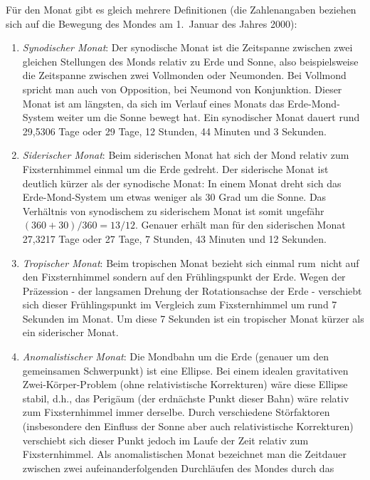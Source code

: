 F\"ur den Monat gibt es gleich mehrere Definitionen (die Zahlenangaben beziehen sich auf
die Bewegung des Mondes am 1.\ Januar des Jahres 2000):
\begin{enumerate}
\item
\textit{Synodischer Monat}: 
Der synodische Monat ist die Zeitspanne zwischen zwei
gleichen Stellungen des Monds relativ zu Erde und Sonne, also beispielsweise die Zeitspanne
zwischen zwei Vollmonden oder Neumonden. Bei Vollmond spricht man auch von 
Opposition,
bei Neumond von Konjunktion. Dieser Monat ist am l\"angsten, da sich im Verlauf eines Monats
das Erde-Mond-System weiter um die Sonne bewegt hat. Ein synodischer Monat dauert rund
29,5306 Tage oder 29 Tage, 12 Stunden, 44 Minuten und 3 Sekunden. 
\item
\textit{Siderischer Monat}:
Beim siderischen Monat hat sich der Mond relativ zum Fixsternhimmel einmal um die
Erde gedreht. Der siderische Monat ist deutlich k\"urzer als der synodische Monat: In einem Monat
dreht sich das Erde-Mond-System um etwas weniger als 30 Grad um die Sonne. Das Verh\"altnis
von synodischem zu siderischem Monat ist somit ungef\"ahr $(360+30)/360=13/12$. Genauer
erh\"alt man f\"ur den siderischen Monat 27,3217 Tage oder 27 Tage, 7 Stunden, 43 Minuten und
12 Sekunden. 
\item
\textit{Tropischer Monat}:
Beim tropischen Monat bezieht sich \glqq einmal rum\grqq\ nicht auf den Fixsternhimmel
sondern auf den Fr\"uhlingspunkt der Erde. Wegen der 
Pr\"azession - der langsamen Drehung der Rotationsachse der Erde - verschiebt sich dieser
Fr\"uhlingspunkt im Vergleich zum Fixsternhimmel um rund 7 Sekunden im Monat. Um diese
7 Sekunden ist ein tropischer Monat k\"urzer als ein siderischer Monat.
\item
\textit{Anomalistischer Monat}:
Die Mondbahn um die Erde (genauer um den gemeinsamen Schwerpunkt) ist eine Ellipse.
Bei einem idealen gravitativen Zwei-K\"orper-Problem (ohne relativistische Korrekturen)
w\"are diese Ellipse stabil, d.h., das Perig\"aum (der erdn\"achste Punkt dieser Bahn) w\"are
relativ zum Fixsternhimmel immer derselbe. Durch verschiedene St\"orfaktoren (insbesondere
den Einfluss der Sonne aber auch relativistische Korrekturen) verschiebt sich dieser Punkt
jedoch im Laufe der Zeit relativ zum Fixsternhimmel. Als anomalistischen Monat bezeichnet man
die Zeitdauer zwischen zwei aufeinanderfolgenden Durchl\"aufen des Mondes durch das

\end{enumerate}
